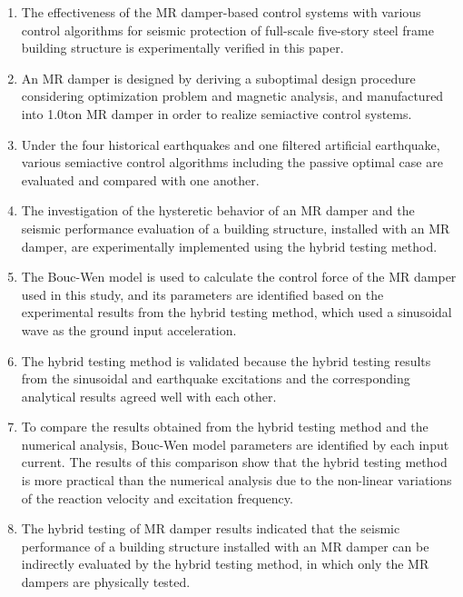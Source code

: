 \begin{enumerate}
\item The effectiveness of the MR damper-based control systems with various control algorithms for seismic protection of full-scale five-story steel frame building structure is experimentally verified in this paper.
\item An MR damper is designed by deriving a suboptimal design procedure considering optimization problem and magnetic analysis, and manufactured into 1.0ton MR damper in order to realize semiactive control systems.
\item Under the four historical earthquakes and one filtered artificial earthquake, various semiactive control algorithms including the passive optimal case are evaluated and compared with one another.
\item The investigation of the hysteretic behavior of an MR damper and the seismic performance evaluation of a building structure, installed with an MR damper, are experimentally implemented using the hybrid testing method.
\item The Bouc-Wen model is used to calculate the control force of the MR damper used in this study, and its parameters are identified based on the experimental results from the hybrid testing method, which used a sinusoidal wave as the ground input acceleration.
\item The hybrid testing method is validated because the hybrid testing results from the sinusoidal and earthquake excitations and the corresponding analytical results agreed well with each other.
\item To compare the results obtained from the hybrid testing method and the numerical analysis, Bouc-Wen model parameters are identified by each input current. The results of this comparison show that the hybrid testing method is more practical than the numerical analysis due to the non-linear variations of the reaction velocity and excitation frequency.
\item The hybrid testing of MR damper results indicated that the seismic performance of a building structure installed with an MR damper can be indirectly evaluated by the hybrid testing method, in which only the MR dampers are physically tested.
\end{enumerate}
